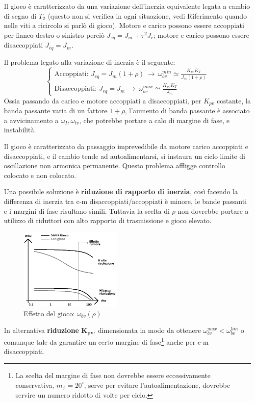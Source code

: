 Il gioco è caratterizzato da una variazione dell'inerzia equivalente legata a cambio di segno di \(T_2\) (questo non si verifica in ogni situazione, vedi {\color{red} Riferimento quando nelle viti a ricircolo si parlò di gioco}). 
Motore e carico possono essere accoppiati per fianco destro o sinistro perciò \(J_{eq} = J_m + \tau^2 J_c\); motore e carico possono essere disaccoppiati \(J_{eq} = J_m\).

Il problema legato alla variazione di inerzia è il seguente:
\[
\begin{cases}
    \text{Accoppiati: } J_{eq} = J_m (1+\rho) \ \rightarrow \ \omega_{bv}^{min} \simeq \frac{K_{pv}K_T}{J_m(1+\rho)} \\
    \text{Disaccoppiati: } J_{eq} = J_m \ \rightarrow \ \omega_{bv}^{max} \simeq \frac{K_{pv} K_T}{J_m}
\end{cases}
\]
Ossia passando da carico e motore accoppiati a disaccoppiati, per \(K_{pv}\) costante, la banda passante varia di un fattore \(1+\rho\), l'aumento di banda passante è associato a avvicinamento a \(\omega_I,\omega_{tv}\), che potrebbe portare a calo di margine di fase, e instabilità.

Il gioco è caratterizzato da passaggio imprevedibile da motore carico accoppiati e disaccoppiati, e il cambio tende ad autoalimentarsi, si instaura un ciclo limite di oscillazione non armonica permanente.
Questo problema affligge controllo colocato e non colocato.

Una possibile soluzione è \textbf{riduzione di rapporto di inerzia}, così facendo la differenza di inerzia tra c-m disaccoppiati/accoppiati è minore, le bande passanti e i margini di fase risultano simili.
Tuttavia la scelta di \(\rho\) non dovrebbe portare a utilizzo di riduttori con alto rapporto di trasmissione e gioco elevato.

\begin{figure}[h]
    \centering
    \includegraphics[width=0.45\textwidth]{Immagini/gioco_banda_passante_rho.png}
    \caption{Effetto del gioco: \(\omega_{bv}(\rho)\)}
\end{figure}


In alternativa \textbf{riduzione} \(\mathbf{K_{pv}}\), dimensionata in modo da ottenere \(\omega_{bv}^{max} < \omega_{bv}^{lim}\) o comunque tale da garantire un certo margine di fase\footnote{La scelta del margine di fase non dovrebbe essere eccessivamente conservativa, \(m_\phi = 20^\circ\), serve per evitare l'autoalimentazione, dovrebbe servire un numero ridotto di volte per ciclo.} anche per c-m disaccoppiati.
